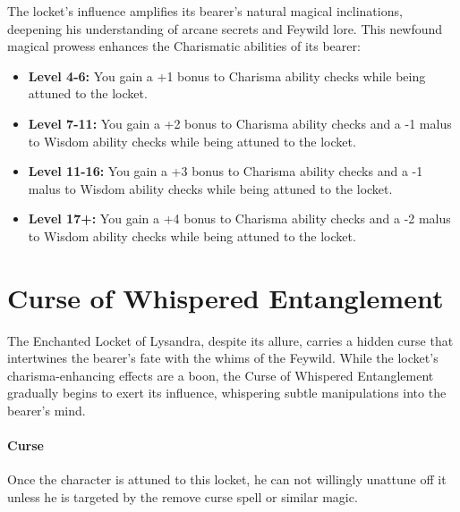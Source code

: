 \documentclass[letterpaper,openany,oneside,twocolumn]{book}
\begin{document}
The locket's influence amplifies its bearer's natural magical inclinations, deepening his understanding of arcane secrets and Feywild lore. This newfound magical prowess enhances the Charismatic abilities of its bearer:
\begin{itemize}
	\item \textbf{Level 4-6:} You gain a +1 bonus to Charisma ability checks while being attuned to the locket.
	\item \textbf{Level 7-11:} You gain a +2 bonus to Charisma ability checks and a -1 malus to Wisdom ability checks while being attuned to the locket.
	\item \textbf{Level 11-16:} You gain a +3 bonus to Charisma ability checks and a -1 malus to Wisdom ability checks while being attuned to the locket.
	\item \textbf{Level 17+:} You gain a +4 bonus to Charisma ability checks and a -2 malus to Wisdom ability checks while being attuned to the locket.
\end{itemize}
\section*{Curse of Whispered Entanglement}
The Enchanted Locket of Lysandra, despite its allure, carries a hidden curse that intertwines the bearer's fate with the whims of the Feywild. While the locket's charisma-enhancing effects are a boon, the Curse of Whispered Entanglement gradually begins to exert its influence, whispering subtle manipulations into the bearer's mind.

\paragraph*{Curse}
Once the character is attuned to this locket, he can not willingly unattune off it unless he is targeted by the remove curse spell or similar magic.
\end{document}
